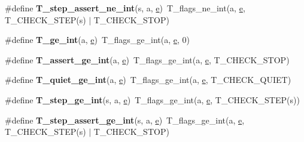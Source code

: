 \begin{DoxyCompactItemize}
\#define {\bfseries T\+\_\+step\+\_\+assert\+\_\+ne\+\_\+int}(s,  a,  \mbox{\hyperlink{sun4u_2tte_8h_a8b0b9ed08e0e18920ec2682f48228c27}{e}})~T\+\_\+flags\+\_\+ne\+\_\+int(a, \mbox{\hyperlink{sun4u_2tte_8h_a8b0b9ed08e0e18920ec2682f48228c27}{e}}, T\+\_\+\+C\+H\+E\+C\+K\+\_\+\+S\+T\+EP(s) $\vert$ T\+\_\+\+C\+H\+E\+C\+K\+\_\+\+S\+T\+OP)
\item 
\mbox{\label{group__RTEMSTestFrameworkChecksInt_ga4587c032a9dcd5f479f36b676b2d2bcf}} 
\#define {\bfseries T\+\_\+ge\+\_\+int}(a,  \mbox{\hyperlink{sun4u_2tte_8h_a8b0b9ed08e0e18920ec2682f48228c27}{e}})~T\+\_\+flags\+\_\+ge\+\_\+int(a, \mbox{\hyperlink{sun4u_2tte_8h_a8b0b9ed08e0e18920ec2682f48228c27}{e}}, 0)
\item 
\mbox{\label{group__RTEMSTestFrameworkChecksInt_gad0aee768e697597376de9adf695af99c}} 
\#define {\bfseries T\+\_\+assert\+\_\+ge\+\_\+int}(a,  \mbox{\hyperlink{sun4u_2tte_8h_a8b0b9ed08e0e18920ec2682f48228c27}{e}})~T\+\_\+flags\+\_\+ge\+\_\+int(a, \mbox{\hyperlink{sun4u_2tte_8h_a8b0b9ed08e0e18920ec2682f48228c27}{e}}, T\+\_\+\+C\+H\+E\+C\+K\+\_\+\+S\+T\+OP)
\item 
\mbox{\label{group__RTEMSTestFrameworkChecksInt_gaf5748f2e564e145899560d4efe81d97f}} 
\#define {\bfseries T\+\_\+quiet\+\_\+ge\+\_\+int}(a,  \mbox{\hyperlink{sun4u_2tte_8h_a8b0b9ed08e0e18920ec2682f48228c27}{e}})~T\+\_\+flags\+\_\+ge\+\_\+int(a, \mbox{\hyperlink{sun4u_2tte_8h_a8b0b9ed08e0e18920ec2682f48228c27}{e}}, T\+\_\+\+C\+H\+E\+C\+K\+\_\+\+Q\+U\+I\+ET)
\item 
\mbox{\label{group__RTEMSTestFrameworkChecksInt_gac68214529238e4c20b14bcd17ca02d8a}} 
\#define {\bfseries T\+\_\+step\+\_\+ge\+\_\+int}(s,  a,  \mbox{\hyperlink{sun4u_2tte_8h_a8b0b9ed08e0e18920ec2682f48228c27}{e}})~T\+\_\+flags\+\_\+ge\+\_\+int(a, \mbox{\hyperlink{sun4u_2tte_8h_a8b0b9ed08e0e18920ec2682f48228c27}{e}}, T\+\_\+\+C\+H\+E\+C\+K\+\_\+\+S\+T\+EP(s))
\item 
\mbox{\label{group__RTEMSTestFrameworkChecksInt_ga6922030900f484523d3dc7212dfcf33d}} 
\#define {\bfseries T\+\_\+step\+\_\+assert\+\_\+ge\+\_\+int}(s,  a,  \mbox{\hyperlink{sun4u_2tte_8h_a8b0b9ed08e0e18920ec2682f48228c27}{e}})~T\+\_\+flags\+\_\+ge\+\_\+int(a, \mbox{\hyperlink{sun4u_2tte_8h_a8b0b9ed08e0e18920ec2682f48228c27}{e}}, T\+\_\+\+C\+H\+E\+C\+K\+\_\+\+S\+T\+EP(s) $\vert$ T\+\_\+\+C\+H\+E\+C\+K\+\_\+\+S\+T\+OP)

\end{DoxyCompactItemize}
